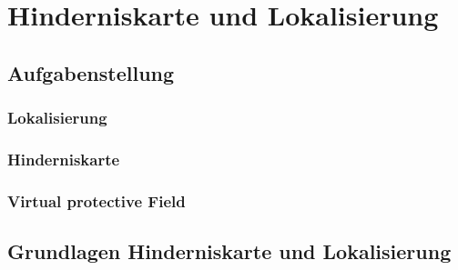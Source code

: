 \chapter{Hinderniskarte und Lokalisierung}
\authorsection{\editordummy}
\section{Aufgabenstellung}
\label{lokalisierung_aufgabenstellung_sec}
\authorsection{\editordummy}

\subsection{Lokalisierung}

\subsection{Hinderniskarte}

\subsection{Virtual protective Field}

\section{Grundlagen Hinderniskarte und Lokalisierung}
\label{lokalisierung_grundlagen_sec}
\authorsection{\editordummy}


